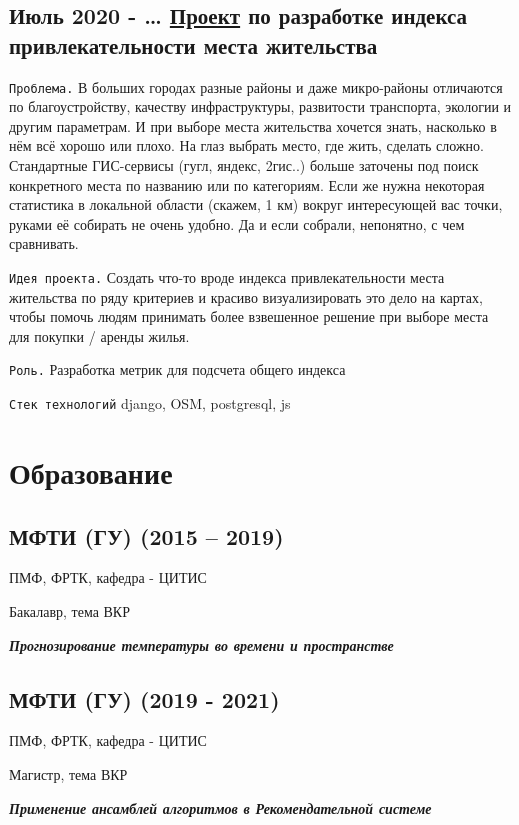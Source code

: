 \documentclass[11pt]{article}
\begin{document}
\subsection{Июль 2020 - \ldots{} \href{http://167.172.97.243:8000/map/}{Проект} по разработке индекса привлекательности места жительства}
\label{sec:org1e5ee45}
\texttt{Проблема.} В больших городах разные районы и даже микро-районы отличаются по благоустройству, качеству инфраструктуры, развитости
транспорта, экологии и другим параметрам. И при выборе места жительства хочется знать, насколько в нём всё хорошо или плохо. На глаз выбрать
место, где жить, сделать сложно. Стандартные ГИС-сервисы (гугл, яндекс, 2гис..) больше заточены под поиск конкретного места по названию или по категориям. Если же нужна некоторая статистика в локальной области (скажем, 1 км) вокруг интересующей вас точки, руками её собирать не очень удобно. Да и если собрали, непонятно, с чем сравнивать.

\texttt{Идея проекта.}
Создать что-то вроде индекса привлекательности места жительства по ряду критериев и красиво визуализировать это дело на картах, чтобы помочь людям принимать более взвешенное решение при выборе места для покупки / аренды жилья.

\texttt{Роль.} Разработка метрик для подсчета общего индекса

\texttt{Стек технологий} django, OSM, postgresql, js
\section{Образование}
\label{sec:org0888bef}
\subsection{МФТИ (ГУ) (2015 – 2019)}
\label{sec:org5d930f6}
ПМФ, ФРТК, кафедра - ЦИТИС

Бакалавр, тема ВКР

\begin{center}
\textbf{\emph{Прогнозирование температуры во времени и пространстве}}
\end{center}
\subsection{МФТИ (ГУ) (2019 - 2021)}
\label{sec:orgdcd5f82}
ПМФ, ФРТК, кафедра - ЦИТИС

Магистр, тема ВКР
\begin{center}
\textbf{\emph{Применение ансамблей алгоритмов в Рекомендательной системе}}
\end{center}
\end{document}

